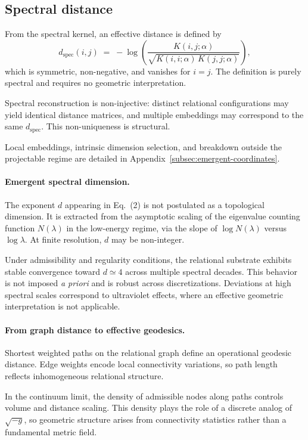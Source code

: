 \subsection{Spectral distance}
  \label{subsec:spectral-distance}

  From the spectral kernel, an effective distance is defined by
  \begin{equation}
    d_{\mathrm{spec}}(i,j)
    \;=\;
    -\log\!\left(
             \frac{K(i,j;\alpha)}{\sqrt{K(i,i;\alpha)\,K(j,j;\alpha)}}
    \right),
  \end{equation}
  which is symmetric, non-negative, and vanishes for $i=j$.
  The definition is purely spectral and requires no geometric interpretation.

  Spectral reconstruction is non-injective:
  distinct relational configurations may yield identical distance matrices,
  and multiple embeddings may correspond to the same $d_{\mathrm{spec}}$.
  This non-uniqueness is structural.

  Local embeddings, intrinsic dimension selection,
  and breakdown outside the projectable regime
  are detailed in Appendix~\ref{subsec:emergent-coordinates}.

  \paragraph{Emergent spectral dimension.}

    The exponent $d$ appearing in Eq.~(2) is not postulated as a topological
    dimension.
    It is extracted from the asymptotic scaling of the eigenvalue counting function
    $N(\lambda)$ in the low-energy regime,
    via the slope of $\log N(\lambda)$ versus $\log \lambda$.
    At finite resolution, $d$ may be non-integer.

    Under admissibility and regularity conditions,
    the relational substrate exhibits stable convergence toward
    $d \simeq 4$ across multiple spectral decades.
    This behavior is not imposed \emph{a priori}
    and is robust across discretizations.
    Deviations at high spectral scales correspond to ultraviolet effects,
    where an effective geometric interpretation is not applicable.

  \paragraph{From graph distance to effective geodesics.}

    Shortest weighted paths on the relational graph define an operational
    geodesic distance.
    Edge weights encode local connectivity variations,
    so path length reflects inhomogeneous relational structure.

    In the continuum limit,
    the density of admissible nodes along paths controls volume and distance scaling.
    This density plays the role of a discrete analog of $\sqrt{-g}$,
    so geometric structure arises from connectivity statistics rather than
    a fundamental metric field.
